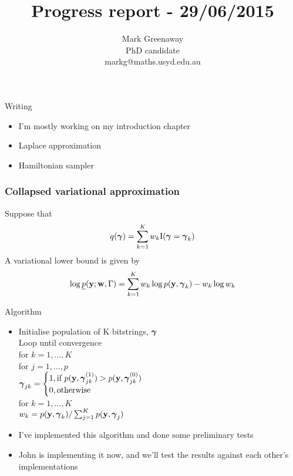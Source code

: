 \documentclass{beamer}
\title{Progress report - 29/06/2015}
\author{Mark Greenaway\\PhD candidate\\markg@maths.usyd.edu.au}
\begin{document}
\begin{frame}
\maketitle
\end{frame}

\begin{frame}{Writing}
\begin{itemize}
\item I'm mostly working on my introduction chapter
\item Laplace approximation
\item Hamiltonian sampler
\end{itemize}
\end{frame}

\begin{frame}
\frametitle{Collapsed variational approximation}
Suppose that
\[
	q({\boldsymbol \gamma}) = \sum_{k=1}^K w_k \text{I}({\boldsymbol \gamma} = {\boldsymbol \gamma}_k)
\]
A variational lower bound is given by
\[
\log \underline{p}({\bf y}; {\bf w}, \Gamma) = \sum_{k=1}^K w_k \log p({\bf y}, {\boldsymbol \gamma}_k) - w_k \log w_k
\]
\end{frame}

\begin{frame}{Algorithm}
\begin{itemize}
\item Initialise population of K bitstrings, ${\boldsymbol \gamma}$ \\
Loop until convergence\\
\quad for $k = 1,  \ldots, K$\\
\quad \quad for $j = 1, \ldots, p$\\
\quad \quad \quad ${\boldsymbol \gamma}_{jk} = \begin{cases}
1, \text{if } p({\bf y}, {\boldsymbol \gamma}_{jk}^{(1)}) > p({\bf y}, {\boldsymbol \gamma}_{jk}^{(0)}) \\
0, \text{otherwise}
\end{cases}$\\
\quad for $k = 1, \ldots, K$\\
\quad \quad $w_k = p({\bf y}, {\boldsymbol \gamma}_k) / \sum_{j=1}^K p({\bf y}, {\boldsymbol \gamma}_j)$
\item I've implemented this algorithm and done some preliminary tests
\item John is implementing it now, and we'll test the results against each other's implementations
\end{itemize}
\end{frame}
\end{document}

